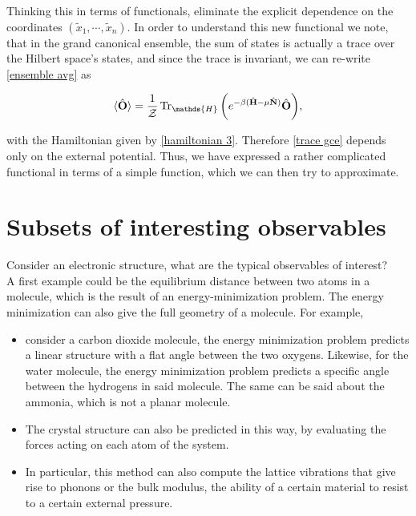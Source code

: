 \documentclass{homework}
\begin{document}
Thinking this in terms of functionals, eliminate the explicit dependence on the coordinates $(\tilde{x}_1, \cdots, \tilde{x}_n)$. In order to understand this new functional we note, that in the grand canonical ensemble, the sum of states is actually a trace over the Hilbert space's states, and since the trace is invariant, we can re-write \eqref{ensemble avg} as 

\begin{equation}
    \langle \hat{\bf O} \rangle = \frac{1}{\mathcal{Z}} \Tr_{\mathds{H}} \bigg(e^{-\beta(\hat{\bf H}-\mu\hat{\bf N})} \hat{\bf O} \bigg),
\label{trace gce}
\end{equation}

with the Hamiltonian given by \eqref{hamiltonian 3}. Therefore \eqref{trace gce} depends only on the external potential. Thus, we have expressed a rather complicated functional in terms of a simple function, which we can then try to approximate. \\

\section{Subsets of interesting observables}

Consider an electronic structure, what are the typical observables of interest? \\

A first example could be the equilibrium distance between two atoms in a molecule, which is the result of an energy-minimization problem. The energy minimization can also give the full geometry of a molecule. 
For example, 

\begin{itemize}
    \item consider a carbon dioxide molecule, the energy minimization problem predicts a linear structure with a flat angle between the two oxygens. Likewise, for the water molecule, the energy minimization problem predicts a specific angle between the hydrogens in said molecule. The same can be said about the ammonia, which is not a planar molecule. 
    \item The crystal structure can also be predicted in this way, by evaluating the forces acting on each atom of the system.
    \item In particular, this method can also compute the lattice vibrations that give rise to phonons or the bulk modulus, the ability of a certain material to resist to a certain external pressure. \\
\end{itemize}
\end{document}
